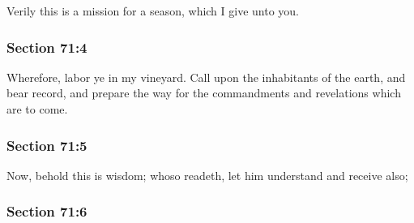 		Verily this is a mission for a season, which I give unto you.


	\subsubsection{Section 71:4} %
		\label{DC71-4}

		Wherefore, labor ye in my vineyard.  Call upon the inhabitants of the earth, and bear record, and prepare the way for the commandments and revelations which are to come.


	\subsubsection{Section 71:5} %
		\label{DC71-5}

		Now, behold this is wisdom; whoso readeth, let him understand and receive also;


	\subsubsection{Section 71:6} %
		\label{DC71-6}

